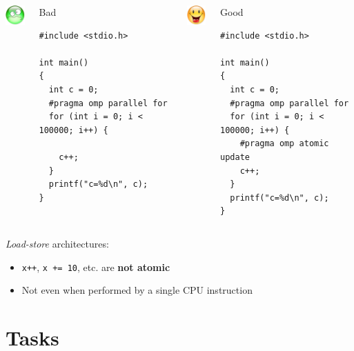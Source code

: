 \documentclass{beamer}
\begin{document}

\begin{frame}[fragile]

  \begin{columns}[t]
  \column{5.5cm}
  \centering\includegraphics[width=1cm]{triste.png}

  \begin{block}{Bad}
\begin{verbatim}
#include <stdio.h>
  
int main()
{
  int c = 0;
  #pragma omp parallel for
  for (int i = 0; i < 100000; i++) { 

    c++; 
  }
  printf("c=%d\n", c);
}
\end{verbatim}
\end{block}
    
    
    \column{5.5cm}
    \centering\includegraphics[width=1cm]{content.png}

  \begin{block}{Good}
\begin{verbatim}
#include <stdio.h>
  
int main()
{
  int c = 0;
  #pragma omp parallel for
  for (int i = 0; i < 100000; i++) { 
    #pragma omp atomic update
    c++; 
  }
  printf("c=%d\n", c);
}
\end{verbatim}
\end{block}
  \end{columns}

  \begin{alertblock}{\emph{Load-store} architectures:}
    \begin{itemize}
    \item \texttt{x++}, \texttt{x += 10}, etc. are \textbf{not atomic}
    \item Not even when performed by a \alert{single CPU instruction}
    \end{itemize}
  \end{alertblock}
\end{frame}

\section{Tasks}
\end{document}
